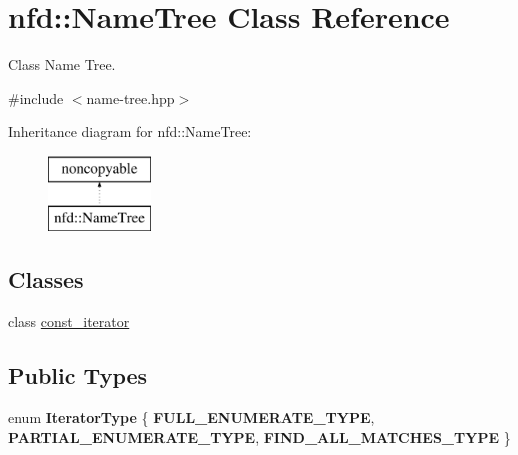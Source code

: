 \hypertarget{classnfd_1_1NameTree}{}\section{nfd\+:\+:Name\+Tree Class Reference}
\label{classnfd_1_1NameTree}


Class Name Tree.  




{\ttfamily \#include $<$name-\/tree.\+hpp$>$}

Inheritance diagram for nfd\+:\+:Name\+Tree\+:\begin{figure}[H]
\begin{center}
\leavevmode
\includegraphics[height=2.000000cm]{classnfd_1_1NameTree}
\end{center}
\end{figure}
\subsection*{Classes}
\begin{DoxyCompactItemize}
\item 
class \hyperlink{classnfd_1_1NameTree_1_1const__iterator}{const\+\_\+iterator}
\end{DoxyCompactItemize}
\subsection*{Public Types}
\begin{DoxyCompactItemize}
\item 
enum {\bfseries Iterator\+Type} \{ {\bfseries F\+U\+L\+L\+\_\+\+E\+N\+U\+M\+E\+R\+A\+T\+E\+\_\+\+T\+Y\+PE}, 
{\bfseries P\+A\+R\+T\+I\+A\+L\+\_\+\+E\+N\+U\+M\+E\+R\+A\+T\+E\+\_\+\+T\+Y\+PE}, 
{\bfseries F\+I\+N\+D\+\_\+\+A\+L\+L\+\_\+\+M\+A\+T\+C\+H\+E\+S\+\_\+\+T\+Y\+PE}
 \}\hypertarget{classnfd_1_1NameTree_a574472390f3fbb72d7165bdde1179132}{}\label{classnfd_1_1NameTree_a574472390f3fbb72d7165bdde1179132}

\end{DoxyCompactItemize}
